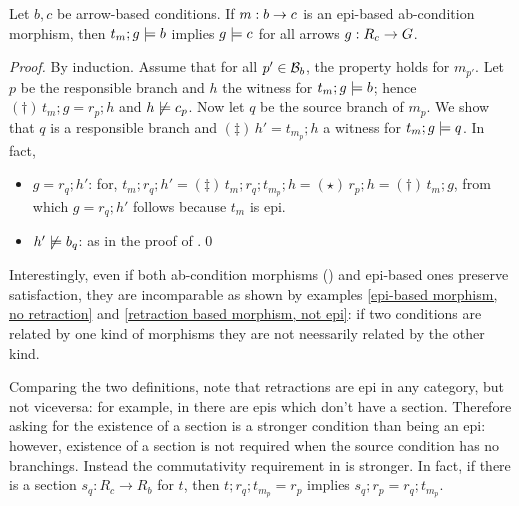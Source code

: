 \begin{proposition}
  Let $b,c$ be arrow-based conditions. If $m:b\rightarrow c$ is an epi-based ab-condition morphism, then $t_m;g\models b$ implies $g \models c$ for all arrows $g:R_c\rightarrow G$.
  \end{proposition}
  \emph{Proof.} By induction. Assume that for all $p'\in \mathcal{B}_b$, the property holds for $m_{p'}$. Let $p$ be the responsible branch and $h$ the witness for $t_m;g\models b$; hence $(\dagger)\, t_m;g=r_p;h$ and $h\not\models c_p$. Now let $q$ be the source branch of $m_p$. We show that $q$ is a responsible branch and $(\ddagger)\, h'=t_{m_p};h$ a witness for $t_m;g\models q$. In fact, 
  \begin{itemize}
  \item $g = r_q;h'$: for, $t_m;r_q;h' =\!(\ddagger)\, t_m;r_q;t_{m_p};h =\!(\star)\, r_p; h =\!(\dagger)\, t_m;g$, from which  $g = r_q;h'$ follows because $t_m$ is epi. 
  \item $h'\not\models b_q$: as in the proof of .\qed
  \end{itemize}

  Interestingly, even if both ab-condition morphisms () and epi-based ones preserve satisfaction, they are incomparable as shown by examples \ref{epi-based morphism, no retraction} and \ref{retraction based morphism, not epi}: if two conditions are related by one kind of morphisms they are not neessarily related by the other kind. 

  Comparing the two definitions, note that retractions are epi in any category, but not viceversa: for example, in  there are epis which don't have a section. Therefore asking for the existence of a section is a stronger condition than being an epi: however, existence of a section is not required when the source condition has no branchings. Instead the commutativity requirement in  is stronger. In fact, if there is a section $s_q: R_c \to R_b$ for $t$, then  $t;r_q;t_{m_p}=r_p$ implies $s_q; r_p = r_q ; t_{m_p}$. 
